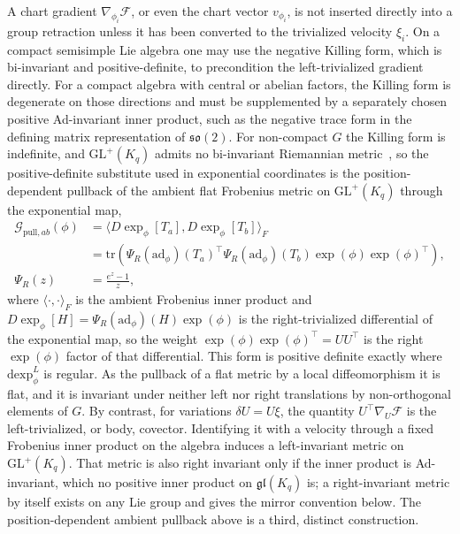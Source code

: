 A chart gradient $\nabla_{\phi_i}\mathcal{F}$, or even the chart vector $v_{\phi_i}$, is not inserted directly into a group retraction unless it has been converted to the trivialized velocity $\xi_i$. On a compact semisimple Lie algebra one may use the negative Killing form, which is bi-invariant and positive-definite, to precondition the left-trivialized gradient directly. For a compact algebra with central or abelian factors, the Killing form is degenerate on those directions and must be supplemented by a separately chosen positive Ad-invariant inner product, such as the negative trace form in the defining matrix representation of $\mathfrak{so}(2)$. For non-compact $G$ the Killing form is indefinite, and $\mathrm{GL}^+(K_q)$ admits no bi-invariant Riemannian metric~\cite[Lemma~7.5]{Milnor1976}, so the positive-definite substitute used in exponential coordinates is the position-dependent pullback of the ambient flat Frobenius metric on $\mathrm{GL}^+(K_q)$ through the exponential map,
\begin{equation}
\begin{aligned}
\mathcal{G}_{\mathrm{pull},ab}(\phi)
&= \langle D\exp_\phi[T_a], D\exp_\phi[T_b] \rangle_F \\
&= \mathrm{tr}\left(
\Psi_R(\mathrm{ad}_\phi)(T_a)^\top
\Psi_R(\mathrm{ad}_\phi)(T_b)
\exp(\phi)\exp(\phi)^\top
\right), \\
\Psi_R(z) &= \frac{e^{z} - 1}{z},
\end{aligned}
\label{eq:pullback_metric}
\end{equation}
where $\langle\cdot,\cdot\rangle_F$ is the ambient Frobenius inner product and $D\exp_\phi[H] = \Psi_R(\mathrm{ad}_\phi)(H)\exp(\phi)$ is the right-trivialized differential of the exponential map, so the weight $\exp(\phi)\exp(\phi)^\top = UU^\top$ is the right $\exp(\phi)$ factor of that differential. This form is positive definite exactly where $\mathrm{dexp}^{L}_\phi$ is regular. As the pullback of a flat metric by a local diffeomorphism it is flat, and it is invariant under neither left nor right translations by non-orthogonal elements of $G$. By contrast, for variations $\delta U=U\xi$, the quantity $U^\top\nabla_U\mathcal{F}$ is the left-trivialized, or body, covector. Identifying it with a velocity through a fixed Frobenius inner product on the algebra induces a left-invariant metric on $\mathrm{GL}^+(K_q)$. That metric is also right invariant only if the inner product is Ad-invariant, which no positive inner product on $\mathfrak{gl}(K_q)$ is; a right-invariant metric by itself exists on any Lie group and gives the mirror convention below. The position-dependent ambient pullback above is a third, distinct construction.
